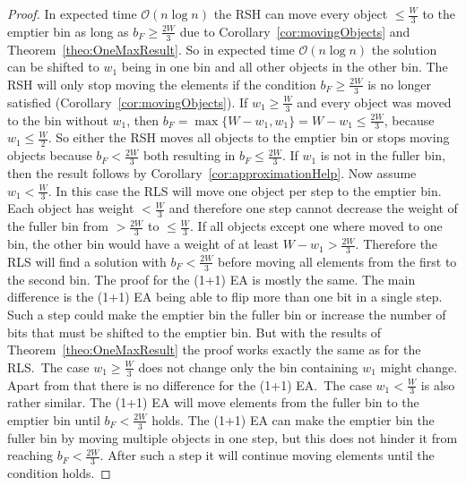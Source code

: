 \begin{proof}
    In expected time $\mathcal{O}(n\log{}n)$ the RSH can move every object $\le \frac{W}{3}$ to the emptier bin as long as $b_F \ge \frac{2W}{3}$ due to Corollary~\ref{cor:movingObjects} and Theorem~\ref{theo:OneMaxResult}.
    So in expected time $\mathcal{O}(n\log{}n)$ the solution can be shifted to $w_1$ being in one bin and all other objects in the other bin.
    The RSH will only stop moving the elements if the condition $b_F \ge \frac{2W}{3}$ is no longer satisfied (Corollary~\ref{cor:movingObjects}).
    If \(w_1 \ge \frac{W}{3}\) and every object was moved to the bin without $w_1$, then \(b_F = \max\{W-w_1, w_1\} = W-w_1 \le \frac{2W}{3}\), because \(w_1 \le \frac{W}{2}\).
    So either the RSH moves all objects to the emptier bin or stops moving objects because $b_F < \frac{2W}{3}$ both resulting in $b_F \le \frac{2W}{3}$.
    If $w_1$ is not in the fuller bin, then the result follows by Corollary~\ref{cor:approximationHelp}.\newline
    Now assume \(w_1 < \frac{W}{3}\).
    In this case the RLS will move one object per step to the emptier bin.
    Each object has weight $< \frac{W}{3}$ and therefore one step cannot decrease the weight of the fuller bin from $> \frac{2W}{3}$ to $\le \frac{W}{3}$.
    If all objects except one where moved to one bin, the other bin would have a weight of at least \(W-w_1 > \frac{2W}{3}\).
    Therefore the RLS will find a solution with $b_F < \frac{2W}{3}$ before moving all elements from the first to the second bin.\newline
    The proof for the (1+1) EA is mostly the same.
    The main difference is the (1+1) EA being able to flip more than one bit in a single step.
    Such a step could make the emptier bin the fuller bin or increase the number of bits that must be shifted to the emptier bin.
    But with the results of Theorem~\ref{theo:OneMaxResult} the proof works exactly the same as for the RLS.\
    The case \(w_1 \ge \frac{W}{3}\) does not change only the bin containing $w_1$ might change.
    Apart from that there is no difference for the (1+1) EA.\
    The case $w_1 < \frac{W}{3}$ is also rather similar.
    The (1+1) EA will move elements from the fuller bin to the emptier bin until $b_F < \frac{2W}{3}$ holds. The (1+1) EA can make the emptier bin the fuller bin by moving multiple objects in one step, but this does not hinder it from reaching $b_F < \frac{2W}{3}$. After such a step it will continue moving elements until the condition holds.
\end{proof}


